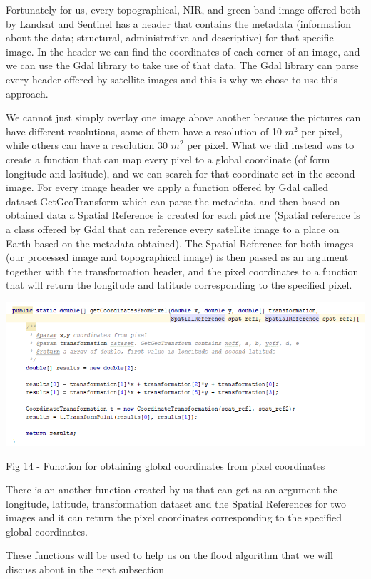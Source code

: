 \documentclass[12pt, a4paper]{report}
\begin{document}
Fortunately for us, every topographical, NIR, and green band image offered both by Landsat and Sentinel has a header that contains the metadata (information about the data; structural, administrative and descriptive) for that specific image. In the header we can find the coordinates of each corner of an image, and we can use the Gdal library to take use of that data. The 
Gdal library can parse every header offered by satellite images and this is why we chose to use this approach. 
\par 

We cannot just simply overlay one image above another because the pictures can have different resolutions, some of them have a resolution of 10 $m^2$ per pixel, while others can have a resolution 30 $m^2$ per pixel. What we did instead was to create a function that can map every pixel to a global coordinate (of form longitude and latitude), and we can search for that coordinate set in the second image. For every image header we apply a function offered by Gdal called dataset.GetGeoTransform which can parse the metadata, and then based on obtained data a Spatial Reference is created for each picture (Spatial reference is a class offered by Gdal that can reference every satellite image to a place on Earth based on the metadata obtained). The Spatial Reference for both images (our processed image and topographical image) is then passed as an argument together with the transformation header, and the pixel coordinates to a function that will return the longitude and latitude corresponding to the specified pixel.

\bigskip
\includegraphics[scale=0.8, left]{java_coordinate_mapping.png}
\begin{center}
Fig 14 - Function for obtaining global coordinates from pixel coordinates
\end{center}
\par 

\quad
There is an another function created by us that can get as an argument the longitude, latitude, transformation dataset and the Spatial References for two images and it can return the pixel coordinates corresponding to the specified global coordinates.
\par 
These functions will be used to help us on the flood algorithm that we will discuss about in the next subsection
\end{document}
